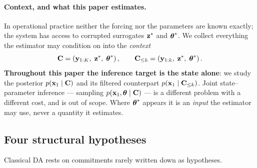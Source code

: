 \paragraph{Context, and what this paper estimates.}
In operational practice neither the forcing nor the parameters are known
exactly; the system has access to corrupted surrogates $\mathbf{z}^{*}$ and $\boldsymbol{\theta}^{*}$.
We collect everything the estimator may condition on into the \emph{context}
\begin{equation}
  \label{eq:context}
  \mathbf{C} = \left(\mathbf{y}_{1:K},\; \mathbf{z}^{*},\; \boldsymbol{\theta}^{*}\right),
  \qquad
  \mathbf{C}_{\leq k} = \left(\mathbf{y}_{1:k},\; \mathbf{z}^{*},\; \boldsymbol{\theta}^{*}\right).
\end{equation}
\textbf{Throughout this paper the inference target is the state alone}: we study
the posterior $p(\mathbf{x}_1 \mid \mathbf{C})$ and its filtered counterpart
$p(\mathbf{x}_1 \mid \mathbf{C}_{\leq k})$. Joint state--parameter inference --- sampling
$p(\mathbf{x}_1, \boldsymbol{\theta} \mid \mathbf{C})$ --- is a different problem with a different cost, and
is out of scope. Where $\boldsymbol{\theta}^{*}$ appears it is an \emph{input} the estimator may
use, never a quantity it estimates.

\subsection{Four structural hypotheses}
\label{sec:hypotheses}

Classical DA rests on commitments rarely written down as hypotheses.

